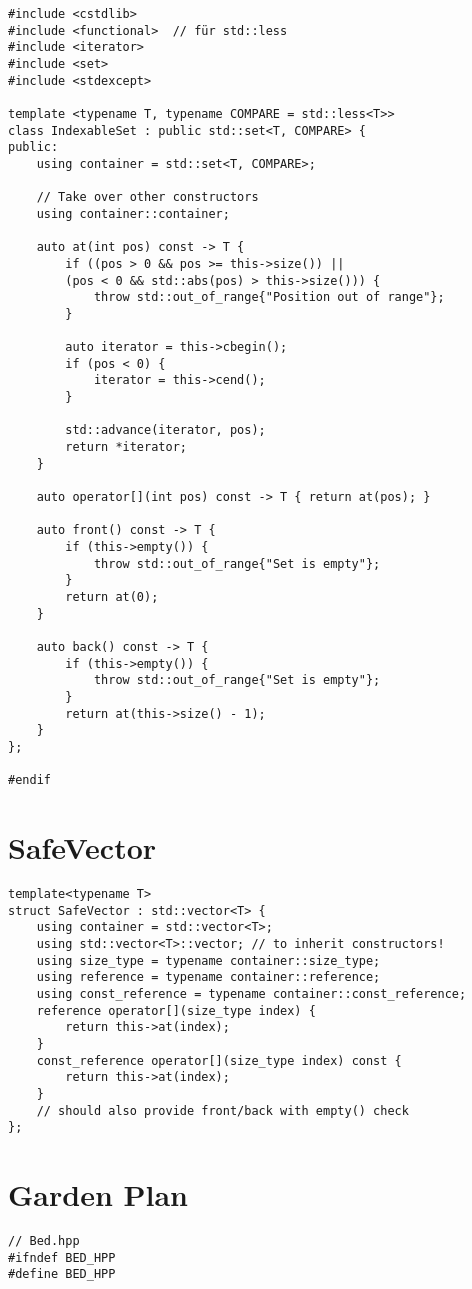 \begin{multicols*}{3}
\begin{verbatim}
#include <cstdlib>
#include <functional>  // für std::less
#include <iterator>
#include <set>
#include <stdexcept>

template <typename T, typename COMPARE = std::less<T>>
class IndexableSet : public std::set<T, COMPARE> {
public:
    using container = std::set<T, COMPARE>;

    // Take over other constructors
    using container::container;

    auto at(int pos) const -> T {
        if ((pos > 0 && pos >= this->size()) ||
        (pos < 0 && std::abs(pos) > this->size())) {
            throw std::out_of_range{"Position out of range"};
        }

        auto iterator = this->cbegin();
        if (pos < 0) {
            iterator = this->cend();
        }

        std::advance(iterator, pos);
        return *iterator;
    }

    auto operator[](int pos) const -> T { return at(pos); }

    auto front() const -> T {
        if (this->empty()) {
            throw std::out_of_range{"Set is empty"};
        }
        return at(0);
    }

    auto back() const -> T {
        if (this->empty()) {
            throw std::out_of_range{"Set is empty"};
        }
        return at(this->size() - 1);
    }
};

#endif
\end{verbatim}

\section{SafeVector}
\begin{verbatim}
template<typename T>
struct SafeVector : std::vector<T> {
    using container = std::vector<T>;
    using std::vector<T>::vector; // to inherit constructors!
    using size_type = typename container::size_type;
    using reference = typename container::reference;
    using const_reference = typename container::const_reference;
    reference operator[](size_type index) {
        return this->at(index);
    }
    const_reference operator[](size_type index) const {
        return this->at(index);
    }
    // should also provide front/back with empty() check
};
\end{verbatim}

\section{Garden Plan}
\begin{verbatim}
// Bed.hpp
#ifndef BED_HPP
#define BED_HPP


\end{verbatim}
\end{multicols*}
